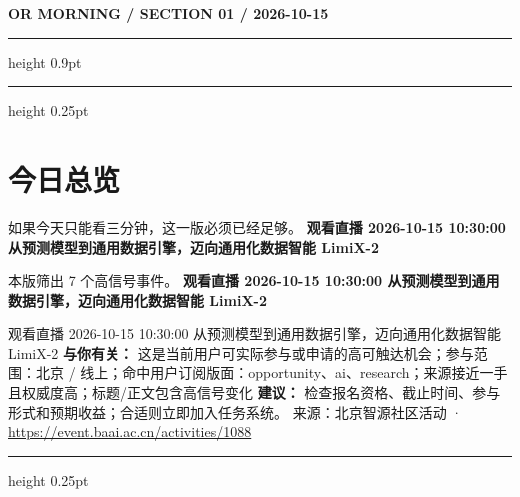 \documentclass[10.5pt]{ctexart}
\begin{document}
{\small\bfseries OR MORNING / SECTION 01 / 2026-10-15}
\vspace{2mm}
\hrule height 0.9pt
\vspace{1.5mm}
\hrule height 0.25pt
\vspace{4mm}
\section*{今日总览}
{\color{ormuted} 如果今天只能看三分钟，这一版必须已经足够。}
\vspace{2mm}
{\fontsize{25}{29}\selectfont\bfseries 观看直播 2026-10-15 10:30:00 从预测模型到通用数据引擎，迈向通用化数据智能 LimiX-2}\par
\vspace{2mm}
{\large 本版筛出 7 个高信号事件。}
\vspace{3mm}
{\Large\bfseries 观看直播 2026-10-15 10:30:00 从预测模型到通用数据引擎，迈向通用化数据智能 LimiX-2}\par
观看直播 2026-10-15 10:30:00 从预测模型到通用数据引擎，迈向通用化数据智能 LimiX-2
\textbf{与你有关：} 这是当前用户可实际参与或申请的高可触达机会；参与范围：北京 / 线上；命中用户订阅版面：opportunity、ai、research；来源接近一手且权威度高；标题/正文包含高信号变化
\textbf{建议：} 检查报名资格、截止时间、参与形式和预期收益；合适则立即加入任务系统。
{\footnotesize\color{ormuted} 来源：北京智源社区活动 · \url{https://event.baai.ac.cn/activities/1088}}
\vspace{3mm}
\hrule height 0.25pt
\vspace{3mm}
\end{document}
